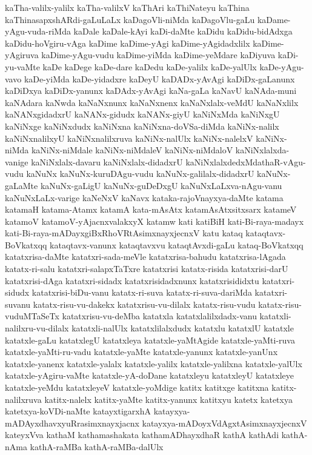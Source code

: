 {kaTha-valilx-yalilx
kaTha-valilxV
kaThAri
kaThiNateyu
kaThina
kaThinasapxshARdi-gaLuLaLx
kaDagoVli-niMda
kaDagoVlu-gaLu
kaDame-yAgu-vuda-riMda
kaDale
kaDale-kAyi
kaDi-daMte
kaDidu
kaDidu-bidAdxga
kaDidu-hoVgiru-vAga
kaDime
kaDime-yAgi
kaDime-yAgidadxlilx
kaDime-yAgiruva
kaDime-yAgu-vudu
kaDime-yiMda
kaDime-yeMdare
kaDiyuva
kaDi-yu-vaMte
kaDe
kaDege
kaDe-dare
kaDedu
kaDe-yalilx
kaDe-yalUlx
kaDe-yAgu-vavo
kaDe-yiMda
kaDe-yidadxre
kaDeyU
kaDADx-yAvAgi
kaDiDx-gaLanunx
kaDiDxya
kaDiDx-yanunx
kaDAdx-yAvAgi
kaNa-gaLa
kaNavU
kaNAda-muni
kaNAdara
kaNwda
kaNaNxnunx
kaNaNxnenx
kaNaNxlalx-veMdU
kaNaNxlilx
kaNANxgidadxrU
kaNANx-gidudx
kaNANx-giyU
kaNiNxMda
kaNiNxgU
kaNiNxge
kaNiNxdudx
kaNiNxna
kaNiNxna-doVSa-diMda
kaNiNx-nalilx
kaNiNxnalilxyU
kaNiNxnalilxruva
kaNiNx-nalUlx
kaNiNx-nalelxV
kaNiNx-niMda
kaNiNx-niMdale
kaNiNx-niMdaleV
kaNiNx-niMdaloV
kaNiNxlalxda-vanige
kaNiNxlalx-davaru
kaNiNxlalx-didadxrU
kaNiNxlalxdedxMdathaR-vAgu-vudu
kaNuNx
kaNuNx-kuruDAgu-vudu
kaNuNx-galilalx-didadxrU
kaNuNx-gaLaMte
kaNuNx-gaLigU
kaNuNx-guDeDxgU
kaNuNxLaLxva-nAgu-vanu
kaNuNxLaLx-varige
kaNeNxV
kaNavx
kataka-rajoVnayxya-daMte
katama
katamaH
katama-Atamx
katamA
kata-mAsAtx
katamAsAtxsitxsarx
katameV
katamoV
katamoV-yAjacnxvalakxyX
katamw
kati
katiBiH
kati-Bi-raya-madayx
kati-Bi-raya-mADayxgiBxRhoVRtAsimxnayxjecnxV
katu
kataq
kataqtavx-BoVkatxqq
kataqtavx-vanunx
kataqtavxvu
kataqtAvxdi-gaLu
kataq-BoVkatxqq
katatxrisa-daMte
katatxri-sada-meVle
katatxrisa-bahudu
katatxrisa-lAgada
katatx-ri-salu
katatxri-salapxTaTxre
katatxrisi
katatx-risida
katatxrisi-darU
katatxrisi-dAga
katatxri-sidadx
katatxrisidadxnunx
katatxrisididxtu
katatxri-sidudx
katatxrisi-biDu-vanu
katatx-ri-suva
katatx-ri-suva-dariMda
katatxri-suvanu
katatx-risu-vu-dakekx
katatxrisu-vu-dilalx
katatx-risu-vudu
katatx-risu-vuduMTaSeTx
katatxrisu-vu-deMba
katatxla
katatxlalilxdadx-vanu
katatxli-nalilxru-vu-dilalx
katatxli-nalUlx
katatxlilalxdudx
katatxlu
katatxlU
katatxle
katatxle-gaLu
katatxlegU
katatxleya
katatxle-yaMtAgide
katatxle-yaMti-ruva
katatxle-yaMti-ru-vadu
katatxle-yaMte
katatxle-yanunx
katatxle-yanUnx
katatxle-yanenx
katatxle-yalalx
katatxle-yalilx
katatxle-yalilxna
katatxle-yalUlx
katatxle-yAgiru-vaMte
katatxle-yA-doDane
katatxleyu
katatxleyU
katatxleye
katatxle-yeMdu
katatxleyeV
katatxle-yoMdige
katitx
katitxge
katitxna
katitx-nalilxruva
katitx-nalelx
katitx-yaMte
katitx-yanunx
katitxyu
katetx
katetxya
katetxya-koVDi-naMte
katayxtigarxhA
katayxya-mADAyxdhavxyuRrasimxnayxjacnx
katayxya-mADoyxVdAgxtAsimxnayxjecnxV
kateyxVva
kathaM
kathamashakata
kathamADhayxdhaR
kathA
kathAdi
kathA-nAma
kathA-raMBa
kathA-raMBa-dalUlx
}
